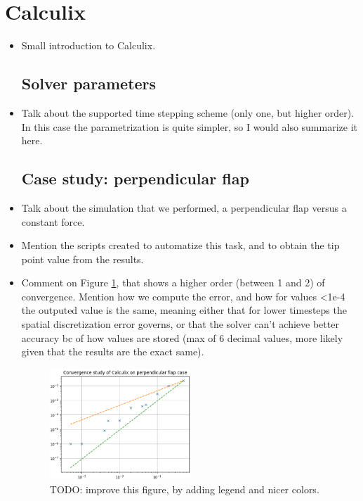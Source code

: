 \documentclass[
  english,        %
  font=times,     %
  onecolumn,      %
]{tumarticle}
\begin{document}
\section{Calculix}
\begin{itemize}
    \item Small introduction to Calculix.
    \subsection{Solver parameters}
    \item Talk about the supported time stepping scheme (only one, but higher order). In this case the parametrization is quite simpler, so I would also summarize it here.
    
    \subsection{Case study: perpendicular flap}
    \item Talk about the simulation that we performed, a perpendicular flap versus a constant force.
    \item Mention the scripts created to automatize this task, and to obtain the tip point value from the results.
    \item Comment on Figure \ref{fig:calculix_convergence}, that shows a higher order (between 1 and 2) of convergence. Mention how we compute the error, and how for values <1e-4 the outputed value is the same, meaning either that for lower timesteps the spatial discretization error governs, or that the solver can't achieve better accuracy bc of how values are stored (max of 6 decimal values, more likely given that the results are the exact same). 
    
    \begin{figure}[!ht]
        \centering
        \includegraphics[width=0.5\textwidth]{resources/calculix_convergence_study.png}
        \caption{TODO: improve this figure, by adding legend and nicer colors.}
        \label{fig:calculix_convergence}
    \end{figure}

\end{itemize}
\end{document}
